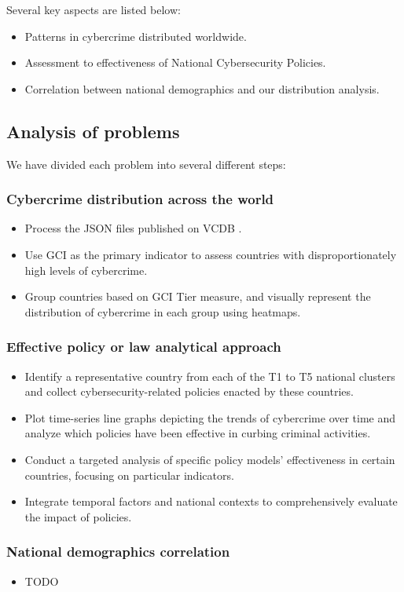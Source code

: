	Several key aspects are listed below:
	\begin{itemize}
		\item Patterns in cybercrime distributed worldwide.
		\item Assessment to effectiveness of National Cybersecurity Policies.
		\item Correlation between national demographics and our distribution analysis.
	\end{itemize}
\subsection{Analysis of problems}\label{subsec:analysis-of-problems} %
	We have divided each problem into several different steps:
	\subsubsection[]{Cybercrime distribution across the world} %
		\begin{itemize}
			\item Process the JSON files published on VCDB .
			\item Use GCI as the primary indicator to assess countries with disproportionately high levels of cybercrime.
			\item Group countries based on GCI Tier measure, and
				visually represent the distribution of cybercrime in each group using heatmaps.
		\end{itemize}
	\subsubsection[]{Effective policy or law analytical approach} %
		\begin{itemize}
			\item Identify a representative country from each of the T1 to T5 national clusters and
				collect cybersecurity-related policies enacted by these countries.
			\item Plot time-series line graphs depicting the trends of cybercrime over time and
				analyze which policies have been effective in curbing criminal activities.
			\item Conduct a targeted analysis of specific policy models' effectiveness in certain countries,
				focusing on particular indicators.
			\item Integrate temporal factors and national contexts to comprehensively evaluate the impact of policies.
		\end{itemize}
	\subsubsection[]{National demographics correlation} %
		\begin{itemize}
			\item TODO %
		\end{itemize}